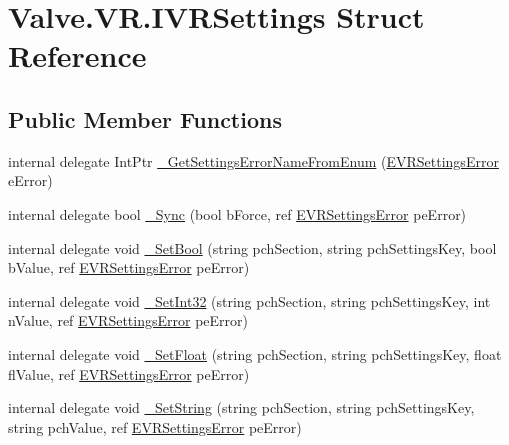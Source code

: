 \hypertarget{struct_valve_1_1_v_r_1_1_i_v_r_settings}{}\section{Valve.\+V\+R.\+I\+V\+R\+Settings Struct Reference}
\label{struct_valve_1_1_v_r_1_1_i_v_r_settings}
\subsection*{Public Member Functions}
\begin{DoxyCompactItemize}
\item 
internal delegate Int\+Ptr \mbox{\hyperlink{struct_valve_1_1_v_r_1_1_i_v_r_settings_a04ee1d90a6a44d0e51d2a78055ca775c}{\+\_\+\+Get\+Settings\+Error\+Name\+From\+Enum}} (\mbox{\hyperlink{namespace_valve_1_1_v_r_aeab7722b211afc3885ed77faa931291f}{E\+V\+R\+Settings\+Error}} e\+Error)
\item 
internal delegate bool \mbox{\hyperlink{struct_valve_1_1_v_r_1_1_i_v_r_settings_a0d624461a28bfbc706c1d101a3b3eaf2}{\+\_\+\+Sync}} (bool b\+Force, ref \mbox{\hyperlink{namespace_valve_1_1_v_r_aeab7722b211afc3885ed77faa931291f}{E\+V\+R\+Settings\+Error}} pe\+Error)
\item 
internal delegate void \mbox{\hyperlink{struct_valve_1_1_v_r_1_1_i_v_r_settings_a9d815c8edfd5d547eddfa9ae2c165714}{\+\_\+\+Set\+Bool}} (string pch\+Section, string pch\+Settings\+Key, bool b\+Value, ref \mbox{\hyperlink{namespace_valve_1_1_v_r_aeab7722b211afc3885ed77faa931291f}{E\+V\+R\+Settings\+Error}} pe\+Error)
\item 
internal delegate void \mbox{\hyperlink{struct_valve_1_1_v_r_1_1_i_v_r_settings_ae73ed83147f47177ed5d90efe0acd8bd}{\+\_\+\+Set\+Int32}} (string pch\+Section, string pch\+Settings\+Key, int n\+Value, ref \mbox{\hyperlink{namespace_valve_1_1_v_r_aeab7722b211afc3885ed77faa931291f}{E\+V\+R\+Settings\+Error}} pe\+Error)
\item 
internal delegate void \mbox{\hyperlink{struct_valve_1_1_v_r_1_1_i_v_r_settings_ad61118d96d4ec60b78250dcb93fae065}{\+\_\+\+Set\+Float}} (string pch\+Section, string pch\+Settings\+Key, float fl\+Value, ref \mbox{\hyperlink{namespace_valve_1_1_v_r_aeab7722b211afc3885ed77faa931291f}{E\+V\+R\+Settings\+Error}} pe\+Error)
\item 
internal delegate void \mbox{\hyperlink{struct_valve_1_1_v_r_1_1_i_v_r_settings_a9609f80e0c236c65db99bcd997c0145b}{\+\_\+\+Set\+String}} (string pch\+Section, string pch\+Settings\+Key, string pch\+Value, ref \mbox{\hyperlink{namespace_valve_1_1_v_r_aeab7722b211afc3885ed77faa931291f}{E\+V\+R\+Settings\+Error}} pe\+Error)

\end{DoxyCompactItemize}
